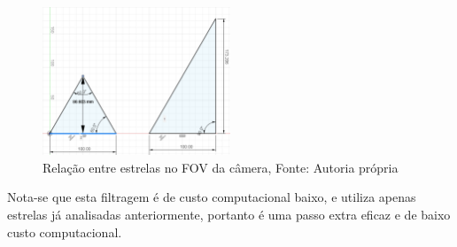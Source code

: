 \begin{figure}[H]
	\centering
	\includegraphics[width=0.5\textwidth]{images/comparacao_entre_triangulos.png}
	\caption{Relação entre estrelas no FOV da câmera, Fonte: Autoria própria}
	\label{fig:comparacao_entre_triangulos}
\end{figure}
Nota-se que esta filtragem é de custo computacional baixo, e utiliza apenas estrelas já analisadas anteriormente, 
portanto é uma passo extra eficaz e de baixo custo computacional.
